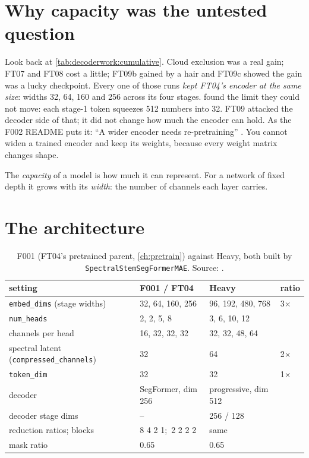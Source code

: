 \section{Why capacity was the untested question}\label{sec:heavy:why}

Look back at \cref{tab:decoderwork:cumulative}. Cloud exclusion was a real gain; FT07 and FT08 cost a little;
FT09b gained by a hair and FT09c showed the gain was a lucky checkpoint. Every one of those runs \emph{kept
FT04's encoder at the same size}: widths 32, 64, 160 and 256 across its four stages.  found
the limit they could not move: each stage-1 token squeezes 512 numbers into 32. FT09 attacked the decoder side of
that; it did not change how much the encoder can hold. As the F002 README puts it: ``A wider encoder needs
re-pretraining'' . You cannot widen a trained encoder and keep its weights, because
every weight matrix changes shape.

\begin{definition}
The \emph{capacity} of a model is how much it can represent. For a network of fixed depth it
grows with its \emph{width}: the number of channels each layer carries.
\end{definition}

\section{The architecture}\label{sec:heavy:arch}

\begin{table}[htbp]
\centering\small
\begin{tabular}{llll}
\toprule
setting & F001 / FT04 & Heavy & ratio\\
\midrule
\texttt{embed\_dims} (stage widths) & 32, 64, 160, 256 & 96, 192, 480, 768 & 3$\times$\\
\texttt{num\_heads} & 2, 2, 5, 8 & 3, 6, 10, 12 & \\
channels per head & 16, 32, 32, 32 & 32, 32, 48, 64 & \\
spectral latent (\texttt{compressed\_channels}) & 32 & 64 & 2$\times$\\
\texttt{token\_dim} & 32 & 32 & 1$\times$\\
decoder & SegFormer, dim 256 & progressive, dim 512 & \\
decoder stage dims & -- & 256 / 128 & \\
reduction ratios; blocks & 8 4 2 1;\ 2 2 2 2 & same & \\
mask ratio & 0.65 & 0.65 & \\
\bottomrule
\end{tabular}
\caption{F001 (FT04's pretrained parent, \cref{ch:pretrain}) against Heavy, both built by
\texttt{SpectralStemSegFormerMAE}. Source: .}
\label{tab:heavy:arch}
\end{table}

